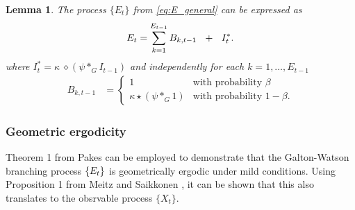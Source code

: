 \documentclass{article}
\newtheorem{lemma}{Lemma}
\begin{document}
\begin{lemma}
The process $\{E_t\}$ from \eqref{eq:E_general} can be expressed as
\begin{equation}
E_t = \sum_{k = 1}^{E_{t - 1}} B_{k, t - 1} \ \ + \ \ I^*_t.
\label{eq:galton_watson}
\end{equation}
where $I^*_t = \kappa\ \diamond (\psi *_G I_{t - 1})$ and independently for each $k = 1, \dots, E_{t - 1}$
\begin{align}
B_{k, t - 1} & = \begin{cases}
1 & \text{with probability } \beta\\ %
\kappa \star (\psi *_G 1) & \text{with probability } 1 - \beta. %
\label{eq:Z_t_i}
\end{cases}
\end{align}
\end{lemma}


\subsubsection{Geometric ergodicity}

Theorem 1 from Pakes \cite{Pakes1971} can be employed to demonstrate that the Galton-Watson branching process $\{E_t\}$ is geometrically ergodic under mild conditions. Using Proposition 1 from Meitz and Saikkonen \cite{Meitz2008}, it can be shown that this also translates to the obsrvable process $\{X_t\}$.
\end{document}
